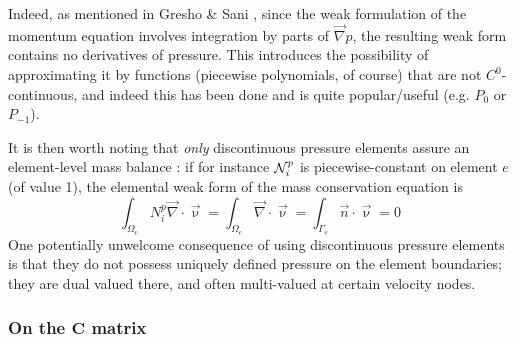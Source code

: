 Indeed, as mentioned in Gresho \& Sani \cite{grsa}, since the 
weak formulation of the momentum equation involves
integration by parts of ${\vec \nabla }p$, the resulting weak form contains 
no derivatives of pressure. This introduces the possibility of approximating it
by functions (piecewise polynomials, of course) that are not $C^0$-continuous, 
and indeed this has been done and is quite popular/useful (e.g. $P_0$ or $P_{-1}$). 

It is then worth noting that {\sl only} discontinuous pressure 
elements assure an element-level mass balance \cite{grsa}:
if for instance ${\mathcal{N}}_i^p$ is piecewise-constant on element $e$ (of value 1), the 
elemental weak form of the mass conservation equation is 
\[
\int_{\Omega_e} N_i^p {\vec \nabla} \cdot {\vec \upnu} = 
\int_{\Omega_e} {\vec \nabla} \cdot {\vec \upnu} = 
\int_{\Gamma_e} {\vec n} \cdot {\vec \upnu} = 0
\]
One potentially unwelcome consequence of using 
discontinuous pressure elements is that they 
do not possess uniquely defined pressure 
on the element boundaries; they are dual valued there, 
and often multi-valued at certain velocity nodes. 

\subsubsection{On the ${\bm C}$ matrix}

